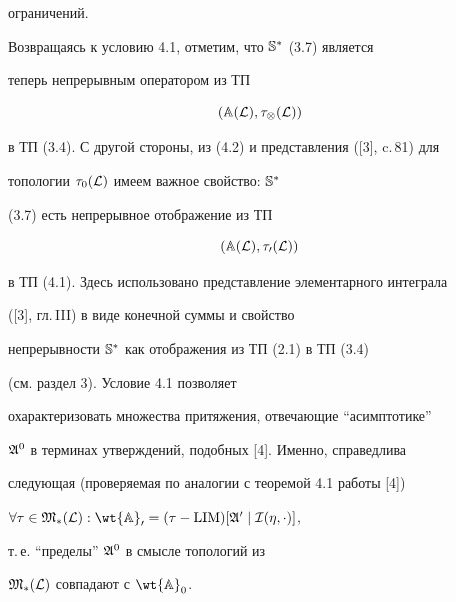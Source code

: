 ограничений.


\medskip





Возвращаясь к условию 4.1, отметим, что $\Bbb S^*$ (3.7) является


теперь непрерывным оператором из ТП


\begin{equation}


(\Bbb A(\cal L),\tau_\otimes(\cal L))


\end{equation}


в ТП (3.4). С другой стороны, из (4.2) и представления ([3], c.\,81) для


топологии $\tau_0(\cal L)$ имеем важное свойство: $\Bbb S^*$


(3.7) есть непрерывное отображение из ТП


\begin{equation}


(\Bbb A(\cal L),\tau_0(\cal L))


\end{equation}


в ТП (4.1). Здесь использовано представление элементарного интеграла


([3], гл.\,III) в виде конечной суммы и свойство


непрерывности $\Bbb S^*$ как отображения из ТП (2.1) в ТП (3.4)


(см. раздел 3). Условие 4.1 позволяет


охарактеризовать множества притяжения, отвечающие ``асимптотике''


$\frak A^0$ в терминах утверждений, подобных [4]. Именно, справедлива


следующая (проверяемая по аналогии с теоремой 4.1 работы [4])





\begin{lems}


$\forall\tau\in\frak M_*(\cal L):


\wt{\Bbb A}_0=(\tau-\LIM)[\frak A^0\mid\cal I(\eta,\cdot)]$,


т.\,е. ``пределы'' $\frak A^0$ в смысле топологий из


$\frak M_*(\cal L)$ совпадают с $\wt{\Bbb A}_0$.


\end{lems}






